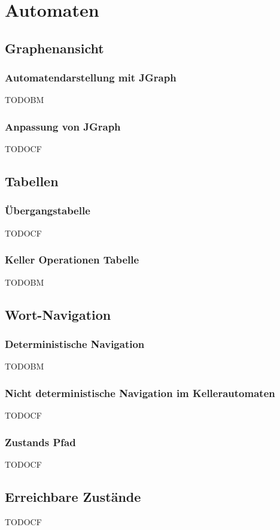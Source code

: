 

\chapter{Automaten}\label{Machines}


\section{Graphenansicht}


\subsection{Automatendarstellung mit JGraph}

TODOBM


\subsection{Anpassung von JGraph}

TODOCF


\section{Tabellen}


\subsection{Übergangstabelle}

TODOCF


\subsection{Keller Operationen Tabelle}

TODOBM


\section{Wort-Navigation}


\subsection{Deterministische Navigation}

TODOBM


\subsection{Nicht deterministische Navigation im Kellerautomaten}

TODOCF


\subsection{Zustands Pfad}

TODOCF


\section{Erreichbare Zustände}

TODOCF